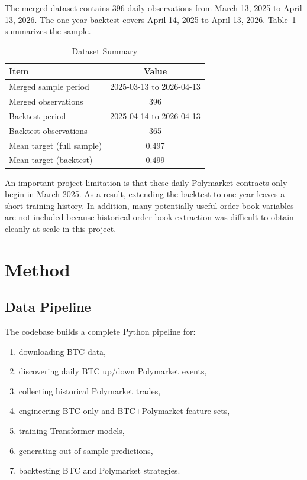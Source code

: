 \documentclass[conference]{IEEEtran}
\begin{document}
The merged dataset contains 396 daily observations from March 13, 2025 to April 13, 2026. The one-year backtest covers April 14, 2025 to April 13, 2026. Table~\ref{tab:data} summarizes the sample.

\begin{table}[htbp]
\caption{Dataset Summary}
\label{tab:data}
\centering
\begin{tabular}{lc}
\toprule
Item & Value \\
\midrule
Merged sample period & 2025-03-13 to 2026-04-13 \\
Merged observations & 396 \\
Backtest period & 2025-04-14 to 2026-04-13 \\
Backtest observations & 365 \\
Mean target (full sample) & 0.497 \\
Mean target (backtest) & 0.499 \\
\bottomrule
\end{tabular}
\end{table}

An important project limitation is that these daily Polymarket contracts only begin in March 2025. As a result, extending the backtest to one year leaves a short training history. In addition, many potentially useful order book variables are not included because historical order book extraction was difficult to obtain cleanly at scale in this project.

\section{Method}
\subsection{Data Pipeline}
The codebase builds a complete Python pipeline for:
\begin{enumerate}
\item downloading BTC data,
\item discovering daily BTC up/down Polymarket events,
\item collecting historical Polymarket trades,
\item engineering BTC-only and BTC+Polymarket feature sets,
\item training Transformer models,
\item generating out-of-sample predictions,
\item backtesting BTC and Polymarket strategies.
\end{enumerate}
\end{document}

